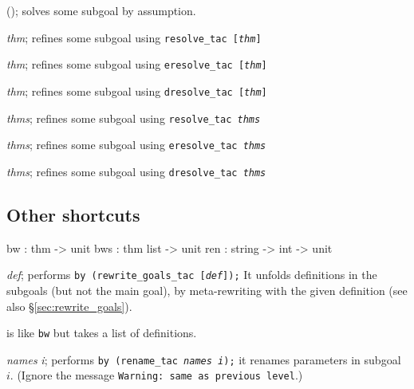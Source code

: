 \begin{ttdescription}
\item[\ttindexbold{fa}();] 
solves some subgoal by assumption.

\item[\ttindexbold{fr} {\it thm};] 
refines some subgoal using \texttt{resolve_tac [{\it thm}]}

\item[\ttindexbold{fe} {\it thm};] 
refines some subgoal using \texttt{eresolve_tac [{\it thm}]}

\item[\ttindexbold{fd} {\it thm};] 
refines some subgoal using \texttt{dresolve_tac [{\it thm}]}

\item[\ttindexbold{frs} {\it thms};] 
refines some subgoal using \texttt{resolve_tac {\it thms}}

\item[\ttindexbold{fes} {\it thms};] 
refines some subgoal using \texttt{eresolve_tac {\it thms}} 

\item[\ttindexbold{fds} {\it thms};] 
refines some subgoal using \texttt{dresolve_tac {\it thms}} 
\end{ttdescription}

\subsection{Other shortcuts}
\begin{ttbox} 
bw  : thm -> unit
bws : thm list -> unit
ren : string -> int -> unit
\end{ttbox}
\begin{ttdescription}
\item[\ttindexbold{bw} {\it def};] performs \texttt{by
    (rewrite_goals_tac [{\it def}]);} It unfolds definitions in the
  subgoals (but not the main goal), by meta-rewriting with the given
  definition (see also \S\ref{sec:rewrite_goals}).

\item[\ttindexbold{bws}] 
is like \texttt{bw} but takes a list of definitions.

\item[\ttindexbold{ren} {\it names} {\it i};] 
performs \texttt{by (rename_tac {\it names} {\it i});} it renames
parameters in subgoal~$i$.  (Ignore the message {\footnotesize\tt Warning:\
  same as previous level}.)
\end{ttdescription}


